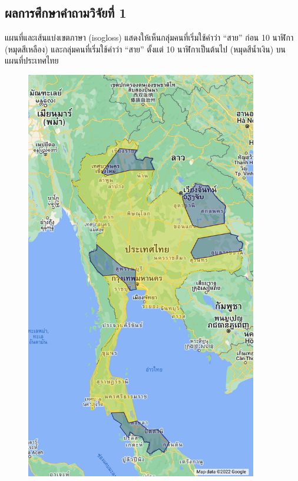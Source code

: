 \documentclass[a4paper]{article}
\begin{document}
\subsection{ผลการศึกษาคำถามวิจัยที่ 1}
    แผนที่และเส้นแบ่งเขตภาษา (isogloss) แสดงให้เห็นกลุ่มคนที่เริ่มใช้คำว่า “สาย” ก่อน 10 นาฬิกา (หมุดสีเหลือง) และกลุ่มคนที่เริ่มใช้คำว่า “สาย” ตั้งแต่ 10 นาฬิกาเป็นต้นไป (หมุดสีน้ำเงิน) บนแผนที่ประเทศไทย
    \begin{figure}[!ht]
        \begin{center}
        \begin{minipage}{0.45\textwidth}
            \includegraphics[width=0.9\textwidth]{map_no_dot}
        \end{minipage}

\end{center}
\end{figure}
\end{document}
